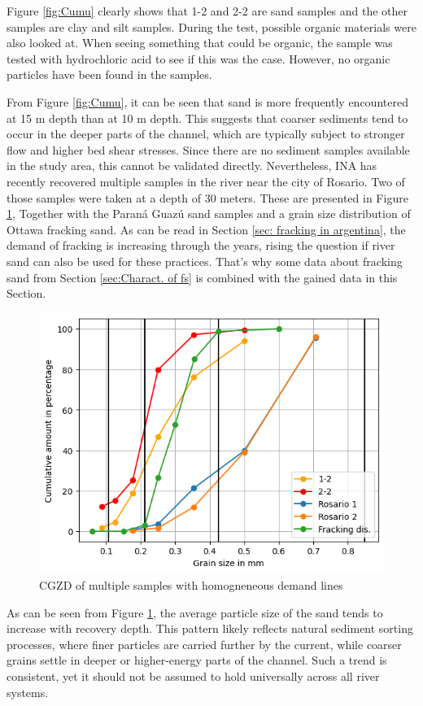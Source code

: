 Figure \ref{fig:Cumu} clearly shows that 1-2 and 2-2 are sand samples and the other samples are clay and silt samples. During the test, possible organic materials were also looked at. When seeing something that could be organic, the sample was tested with hydrochloric acid to see if this was the case. However, no organic particles have been found in the samples. 

From Figure \ref{fig:Cumu}, it can be seen that sand is more frequently encountered at 15 m depth than at 10 m depth. This suggests that coarser sediments tend to occur in the deeper parts of the channel, which are typically subject to stronger flow and higher bed shear stresses. Since there are no sediment samples available in the study area, this cannot be validated directly. Nevertheless, INA has recently recovered multiple samples in the river near the city of Rosario. Two of those samples were taken at a depth of 30 meters. These are presented in Figure \ref{fig:rd}, Together with the Paraná Guazú sand samples and a grain size distribution of Ottawa fracking sand. As can be read in Section \ref{sec: fracking in argentina}, the demand of fracking is increasing through the years, rising the question if river sand can also be used for these practices.
That's why some data about fracking sand from Section \ref{sec:Charact. of fs} is combined with the gained data in this Section. 

\begin{figure}[H]
    \centering
    \includegraphics[width=0.75\linewidth]{figures//ch6/comparison2.png}
    \caption{CGZD of multiple samples with homogneneous demand lines \autocite{bensonFracSandUnited2015}}
    \label{fig:rd}
\end{figure}

As can be seen from Figure \ref{fig:rd}, the average particle size of the sand tends to increase with recovery depth. This pattern likely reflects natural sediment sorting processes, where finer particles are carried further by the current, while coarser grains settle in deeper or higher-energy parts of the channel. Such a trend is consistent, yet it should not be assumed to hold universally across all river systems.

